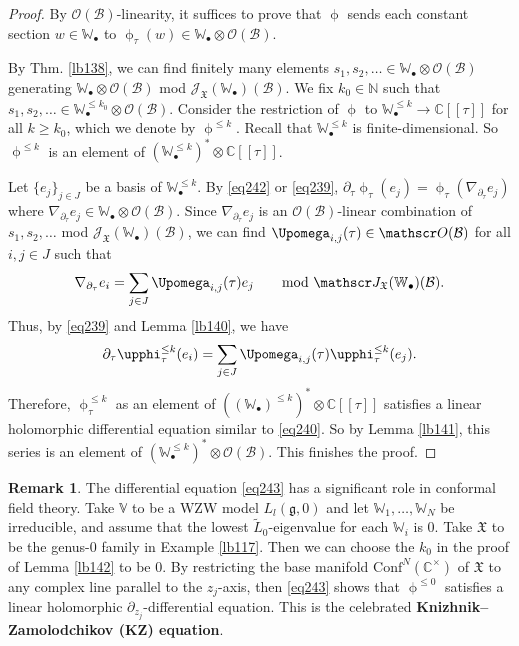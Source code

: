 \documentclass[11pt,b5paper,notitlepage]{article}
\theoremstyle{definition}
\newtheorem{rem}[df]{Remark}
\theoremstyle{plain}
\newcommand{\fk}{\mathfrak}
\newcommand{\mc}{\mathcal}
\newcommand{\wtd}{\widetilde}
\newcommand{\Conf}{\mathrm{Conf}}
\newcommand{\scr}{\mathscr}
\newcommand{\gk}{\mathfrak g}
\newcommand{\blt}{\bullet}
\newcommand{\Vbb}{\mathbb V}
\newcommand{\Wbb}{\mathbb W}
\newcommand{\Cbb}{\mathbb C}
\newcommand{\Nbb}{\mathbb N}
\numberwithin{equation}{section}
\begin{document}
\begin{proof}
By $\scr O(\mc B)$-linearity, it suffices to prove that $\upphi$ sends each constant section $w\in\Wbb_\blt$ to $\upphi_\tau(w)\in\Wbb_\blt\otimes\scr O(\mc B)$.

By Thm. \ref{lb138}, we can find finitely many elements $s_1,s_2,\dots\in\Wbb_\blt\otimes\scr O(\mc B)$ generating $\Wbb_\blt\otimes\scr O(\mc B)$ mod $\scr J_{\fk X}(\Wbb_\blt)(\mc B)$. We fix $k_0\in\Nbb$ such that $s_1,s_2,\dots\in\Wbb_\blt^{\leq k_0}\otimes\scr O(\mc B)$. Consider the restriction of $\upphi$ to $\Wbb_\blt^{\leq k}\rightarrow \Cbb[[\tau]]$ for all $k\geq k_0$, which we denote by $\upphi^{\leq k}$. Recall that $\Wbb_\blt^{\leq k}$ is finite-dimensional.  So $\upphi^{\leq k}$ is an element of $(\Wbb_\blt^{\leq k})^*\otimes\Cbb[[\tau]]$.

Let $\{e_j\}_{j\in J}$ be a basis of $\Wbb_\blt^{\leq k}$. By \eqref{eq242} or \eqref{eq239}, $\partial_\tau\upphi_\tau(e_j)=\upphi_\tau(\nabla_{\partial_\tau} e_j)$ where $\nabla_{\partial_\tau} e_j\in\Wbb_\blt\otimes\scr O(\mc B)$. Since $\nabla_{\partial_\tau} e_j$ is an $\scr O(\mc B)$-linear combination of $s_1,s_2,\dots$ mod $\scr J_{\fk X}(\Wbb_\blt)(\mc B)$, we can find $\Upomega_{i,j}(\tau)\in\scr O(\mc B)$ for all $i,j\in J$ such that
\begin{align*}
\nabla_{\partial_\tau} e_i=\sum_{j\in J}\Upomega_{i,j}(\tau)e_j\qquad\text{mod }\scr J_{\fk X}(\Wbb_\blt)(\mc B).
\end{align*}
Thus, by \eqref{eq239} and Lemma \ref{lb140}, we have
\begin{align}
\partial_\tau\upphi_\tau^{\leq k}(e_i)=\sum_{j\in J}\Upomega_{i,j}(\tau)\upphi_\tau^{\leq k}(e_j).\label{eq243}
\end{align}
Therefore,  $\upphi_\tau^{\leq k}$ as an element of $((\Wbb_\blt)^{\leq k})^*\otimes\Cbb[[\tau]]$ satisfies a linear holomorphic differential equation similar to \eqref{eq240}. So by Lemma \ref{lb141}, this series is an element of $(\Wbb_\blt^{\leq k})^*\otimes\scr O(\mc B)$. This finishes the proof.
\end{proof}



\begin{rem}
The differential equation \eqref{eq243} has a significant role in conformal field theory. Take $\Vbb$ to be a WZW model $L_l(\gk,0)$ and let $\Wbb_1,\dots,\Wbb_N$ be irreducible, and assume that the lowest $\wtd L_0$-eigenvalue for each $\Wbb_i$ is $0$. Take $\fk X$ to be the genus-$0$ family in Example \ref{lb117}. Then we can choose the $k_0$ in the proof of Lemma \ref{lb142} to be $0$. By restricting the base manifold $\Conf^N(\Cbb^\times)$ of $\fk X$ to any complex line parallel to the $z_j$-axis, then \eqref{eq243} shows that $\upphi^{\leq 0}$ satisfies a linear holomorphic $\partial_{z_j}$-differential equation. This is the celebrated \textbf{Knizhnik–Zamolodchikov (KZ) equation}.
\end{rem}
\end{document}
